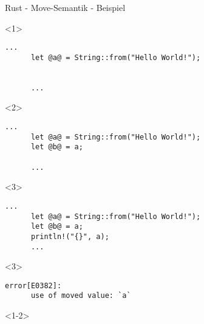 

\lstset{showstringspaces=true,columns=fullflexible,keepspaces=true}

\begin{frame}[fragile]{Rust - Move-Semantik - Beispiel}



  \begin{onlyenv}<1> {
    \begin{lstlisting}[frame=single,style=base]
      ...
      let @a@ = String::from("Hello World!");


      ...
    \end{lstlisting}
  }
  \end{onlyenv}


  \begin{onlyenv}<2> {
    \begin{lstlisting}[frame=single,style=base]
      ...
      let @a@ = String::from("Hello World!");
      let @b@ = a;

      ...
    \end{lstlisting}
  }
  \end{onlyenv}


  \begin{onlyenv}<3> {
    \begin{lstlisting}[frame=single,style=base]
      ...
      let @a@ = String::from("Hello World!");
      let @b@ = a;
      println!("{}", a);
      ...
    \end{lstlisting}
  }
  \end{onlyenv}

  \begin{onlyenv}<3> {
    \begin{lstlisting}[frame=single,style=base]
      error[E0382]:
      use of moved value: `a`
    \end{lstlisting}
  }
  \end{onlyenv}


  \begin{onlyenv}<1-2> {
    \begin{lstlisting}[frame=single,style=base]


    \end{lstlisting}
  }
  \end{onlyenv}

\end{frame}